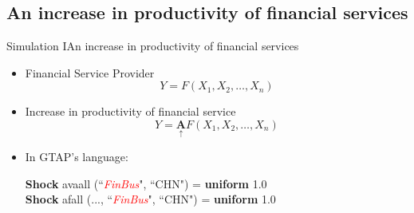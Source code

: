 \documentclass{beamer}
\begin{document}
\subsection{An increase in productivity of financial services}
\begin{frame}{Simulation I}{An increase in productivity of financial services}
\begin{itemize}
\item<1-> Financial Service Provider
$$ Y = F(X_1, X_2, \dots, X_n) $$
\item<2-> Increase in productivity of financial service 
$$ Y = \underset{\uparrow}{\bm{A}} 
   F(X_1,X_2, \dots, X_n)
$$
\item<3-> In GTAP's language:
\begin{center}
\textbf{Shock} \textcolor{OliveGreen}{avaall}
(``\textit{\textcolor{red}{FinBus}}", ``CHN") =
\textbf{uniform} 1.0 \\
\textbf{Shock} \textcolor{OliveGreen}{afall}
(..., ``\textit{\textcolor{red}{FinBus}}", ``CHN") = 
\textbf{uniform} 1.0 \\
\end{center}
\end{itemize}
\end{frame}
\end{document}
